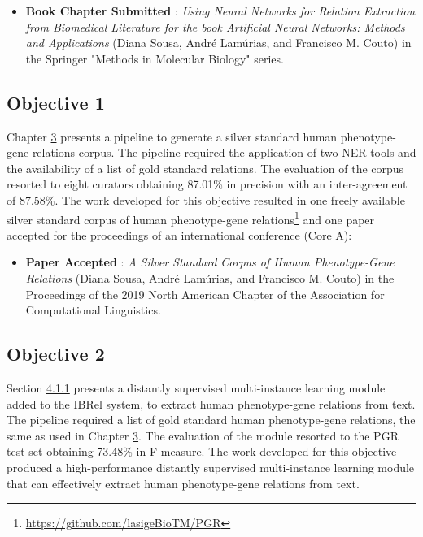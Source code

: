 \begin{itemize}
    \item{\textbf{Book Chapter Submitted} \citep{book}: \textit{Using Neural Networks for Relation Extraction from Biomedical Literature for the book Artificial Neural Networks: Methods and Applications} (Diana Sousa, André Lamúrias, and Francisco M. Couto) in the Springer "Methods in Molecular Biology" series.}
\end{itemize}


\subsection{Objective 1}

Chapter \hyperlink{3}{3} presents a pipeline to generate a silver standard human phenotype-gene relations corpus. The pipeline required the application of two NER tools and the availability of a list of gold standard relations. The evaluation of the corpus resorted to eight curators obtaining 87.01\% in precision with an inter-agreement of 87.58\%. The work developed for this objective resulted in one freely available silver standard corpus of human phenotype-gene relations\footnote{\url{https://github.com/lasigeBioTM/PGR}} and one paper accepted for the proceedings of an international conference (Core A):

\begin{itemize}
    \item{\textbf{Paper Accepted} \citep{DBLP:journals/corr/abs-1903-10728}: \textit{A Silver Standard Corpus of Human Phenotype-Gene Relations} (Diana Sousa, André Lamúrias, and Francisco M. Couto) in the Proceedings of the 2019 North American Chapter of the Association for Computational Linguistics.}
\end{itemize}


\subsection{Objective 2}

Section \hyperlink{4.1.1}{4.1.1} presents a distantly supervised multi-instance learning module added to the IBRel system, to extract human phenotype-gene relations from text. The pipeline required a list of gold standard human phenotype-gene relations, the same as used in Chapter \hyperlink{3}{3}. The evaluation of the module resorted to the PGR test-set obtaining 73.48\% in F-measure. The work developed for this objective produced a high-performance distantly supervised multi-instance learning module that can effectively extract human phenotype-gene relations from text.

